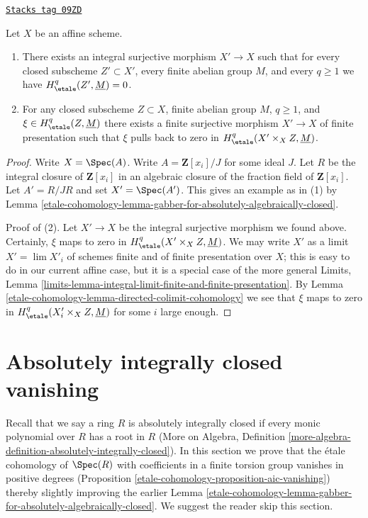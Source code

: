 \begin{lemma}
\label{etale-cohomology-lemma-integral-cover-trivial-cohomology}
\href{https://stacks.math.columbia.edu/tag/09ZD}{\texttt{Stacks tag 09ZD}}

Let $X$ be an affine scheme.
\begin{enumerate}
\item There exists an integral surjective morphism $X' \to X$ such that for
every closed subscheme $Z' \subset X'$, every finite abelian group $M$, and
every $q \geq 1$ we have $H^q_\etale(Z', \underline{M}) = 0$.
\item For any closed subscheme $Z \subset X$, finite abelian group $M$,
$q \geq 1$, and $\xi \in H^q_\etale(Z, \underline{M})$ there exists a
finite surjective morphism $X' \to X$ of finite presentation such that
$\xi$ pulls back to zero in $H^q_\etale(X' \times_X Z, \underline{M})$.
\end{enumerate}
\end{lemma}

\begin{proof}
Write $X = \Spec(A)$. Write $A = \mathbf{Z}[x_i]/J$ for some ideal $J$.
Let $R$ be the integral closure of $\mathbf{Z}[x_i]$ in an algebraic
closure of the fraction field of $\mathbf{Z}[x_i]$. Let
$A' = R/JR$ and set $X' = \Spec(A')$. This gives an example as in (1) by
Lemma \ref{etale-cohomology-lemma-gabber-for-absolutely-algebraically-closed}.

\medskip\noindent
Proof of (2). Let $X' \to X$ be the integral surjective morphism we found
above. Certainly, $\xi$ maps to zero in
$H^q_\etale(X' \times_X Z, \underline{M})$. We may write $X'$ as a
limit $X' = \lim X'_i$ of schemes finite and of finite presentation
over $X$; this is easy to do in our current affine case, but it
is a special case of the more general Limits, Lemma
\ref{limits-lemma-integral-limit-finite-and-finite-presentation}.
By Lemma \ref{etale-cohomology-lemma-directed-colimit-cohomology}
we see that $\xi$ maps to zero in $H^q_\etale(X'_i \times_X Z, \underline{M})$
for some $i$ large enough.
\end{proof}

\section{Absolutely integrally closed vanishing}
\label{etale-cohomology-section-aic-vanishing}
Recall that we say a ring $R$ is absolutely integrally closed
if every monic polynomial over $R$ has a root in $R$
(More on Algebra, Definition
\ref{more-algebra-definition-absolutely-integrally-closed}).
In this section we prove that the \'etale cohomology of
$\Spec(R)$ with coefficients in a finite torsion group
vanishes in positive degrees (Proposition \ref{etale-cohomology-proposition-aic-vanishing})
thereby slightly improving the earlier
Lemma \ref{etale-cohomology-lemma-gabber-for-absolutely-algebraically-closed}.
We suggest the reader skip this section.


